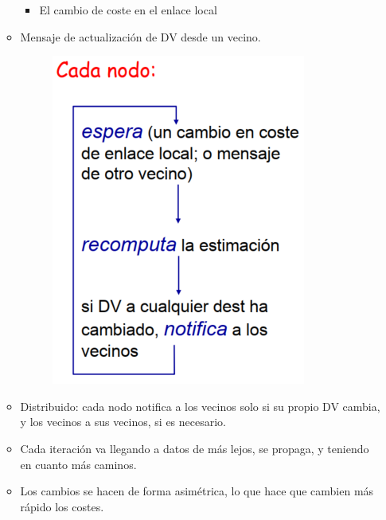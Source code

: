 \documentclass[12pt, twoside, openright]{report} %
\begin{document}
\begin{itemize}
\begin{itemize}
		            \begin{itemize}
			            \item El cambio de coste en el enlace local
		            \end{itemize}
		      \item Mensaje de actualización de DV desde un vecino.
		            \begin{figure}[H]
			            {\includegraphics[scale=.4]{Untitled 43.png}}
		            \end{figure}
		      \item Distribuido: cada nodo notifica a los vecinos solo si su propio DV
		            cambia, y los vecinos a sus vecinos, si es necesario.
		      \item Cada iteración va llegando a datos de más lejos, se propaga, y
		            teniendo en cuanto más caminos.
		      \item Los cambios se hacen de forma asimétrica, lo que hace que cambien
		            más rápido los costes.


\end{itemize}
\end{itemize}
\end{document}

